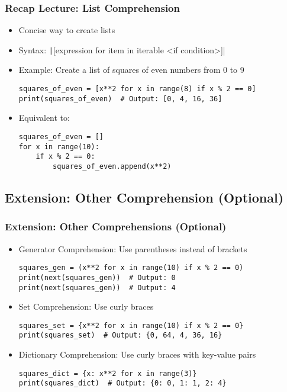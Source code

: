 \documentclass{beamer}
\begin{document}
\begin{frame}[fragile]
    \frametitle{Recap Lecture: List Comprehension}
    \begin{itemize}
        \item Concise way to create lists
        \item Syntax: \texttt|[expression for item in iterable <if condition>]|
        \item Example: Create a list of squares of even numbers from 0 to 9
              \begin{verbatim}
squares_of_even = [x**2 for x in range(8) if x % 2 == 0]
print(squares_of_even)  # Output: [0, 4, 16, 36]
              \end{verbatim}
        \item Equivalent to:
              \begin{verbatim}
squares_of_even = []
for x in range(10):
    if x % 2 == 0:
        squares_of_even.append(x**2)
              \end{verbatim}
    \end{itemize}
\end{frame}

\subsection{Extension: Other Comprehension (Optional)}

\begin{frame}[fragile]
    \frametitle{Extension: Other Comprehensions (Optional)}
    \begin{itemize}
        \item Generator Comprehension: Use parentheses instead of brackets
              \begin{verbatim}
squares_gen = (x**2 for x in range(10) if x % 2 == 0)
print(next(squares_gen))  # Output: 0
print(next(squares_gen))  # Output: 4
              \end{verbatim}
        \item Set Comprehension: Use curly braces
              \begin{verbatim}
squares_set = {x**2 for x in range(10) if x % 2 == 0}
print(squares_set)  # Output: {0, 64, 4, 36, 16}
              \end{verbatim}
        \item Dictionary Comprehension: Use curly braces with key-value pairs
              \begin{verbatim}
squares_dict = {x: x**2 for x in range(3)}
print(squares_dict)  # Output: {0: 0, 1: 1, 2: 4}
              \end{verbatim}
    \end{itemize}
\end{frame}
\end{document}
